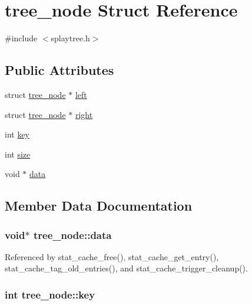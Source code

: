 \hypertarget{structtree__node}{\section{tree\-\_\-node Struct Reference}
\label{structtree__node}
}


{\ttfamily \#include $<$splaytree.\-h$>$}

\subsection*{Public Attributes}
\begin{DoxyCompactItemize}
\item 
struct \hyperlink{structtree__node}{tree\-\_\-node} $\ast$ \hyperlink{structtree__node_a3e30a7ba2a4e3286ec7394ba920f2893}{left}
\item 
struct \hyperlink{structtree__node}{tree\-\_\-node} $\ast$ \hyperlink{structtree__node_a2f0787899c2e8825c8b1a2c4f55a3804}{right}
\item 
int \hyperlink{structtree__node_acbb08d14c7aa9cad05631c1f960667fc}{key}
\item 
int \hyperlink{structtree__node_a4fe936bc675ebeb78a22971379257c77}{size}
\item 
void $\ast$ \hyperlink{structtree__node_a48fb98a8a85ec0497df056f52700a87e}{data}
\end{DoxyCompactItemize}


\subsection{Member Data Documentation}
\hypertarget{structtree__node_a48fb98a8a85ec0497df056f52700a87e}{
\subsubsection[{data}]{\setlength{\rightskip}{0pt plus 5cm}void$\ast$ tree\-\_\-node\-::data}}\label{structtree__node_a48fb98a8a85ec0497df056f52700a87e}


Referenced by stat\-\_\-cache\-\_\-free(), stat\-\_\-cache\-\_\-get\-\_\-entry(), stat\-\_\-cache\-\_\-tag\-\_\-old\-\_\-entries(), and stat\-\_\-cache\-\_\-trigger\-\_\-cleanup().

\hypertarget{structtree__node_acbb08d14c7aa9cad05631c1f960667fc}{
\subsubsection[{key}]{\setlength{\rightskip}{0pt plus 5cm}int tree\-\_\-node\-::key}}\label{structtree__node_acbb08d14c7aa9cad05631c1f960667fc}


